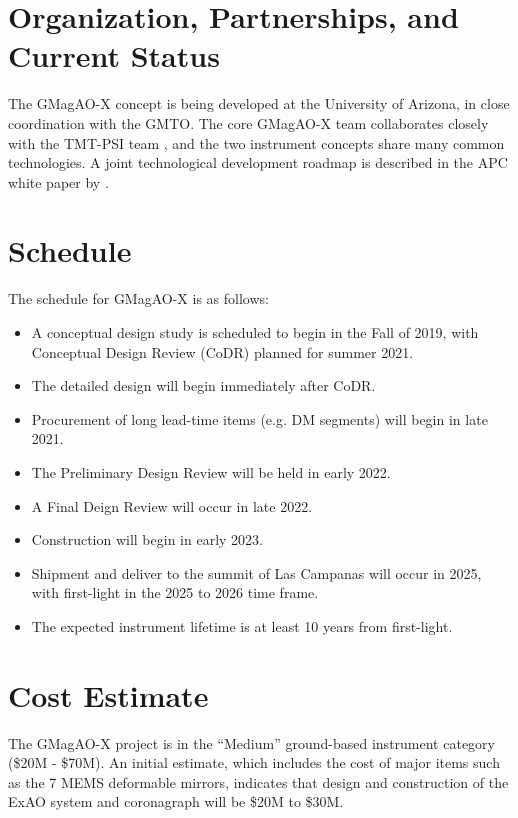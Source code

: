 \documentclass[12pt,preprint]{aastex}
\begin{document}
\section{Organization, Partnerships, and Current Status}  
The GMagAO-X concept is being developed at the University of Arizona, in close coordination with the GMTO.  The core GMagAO-X team collaborates closely with the TMT-PSI team \citep[Astro 2020 APC white paper:][]{tmt-psi}, and the two instrument concepts share many common technologies.  A joint technological development roadmap is described in the APC white paper by \citet{roadmap}. 

\section{Schedule}
The schedule for GMagAO-X is as follows:
\vspace{-10pt}
\begin{itemize} \itemsep 0pt
\item A conceptual design study is scheduled to begin in the Fall of 2019, with Conceptual Design Review (CoDR) planned for summer 2021.  
\item The detailed design will begin immediately after CoDR.
\item Procurement of long lead-time items (e.g. DM segments) will begin in late 2021.  
\item The Preliminary Design Review will be held in early 2022.
\item A Final Deign Review will occur in late 2022.
\item Construction will begin in early 2023.
\item Shipment and deliver to the summit of Las Campanas will occur in 2025, with first-light in the 2025 to 2026 time frame.
\item The expected instrument lifetime is at least 10 years from first-light.  
\end{itemize}

\section{Cost Estimate}

The GMagAO-X project is in the ``Medium'' ground-based instrument category (\$20M - \$70M).  An initial estimate, which includes the cost of major items such as the 7 MEMS deformable mirrors, indicates that design and construction of the ExAO system and coronagraph will be \$20M to \$30M.   



\clearpage
\end{document}

